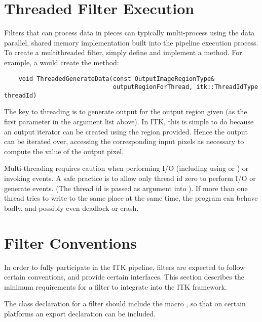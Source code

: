\section{Threaded Filter Execution}
\label{sec:ThreadedFilterExecution}

Filters that can process data in pieces can typically multi-process
using the data parallel, shared memory implementation built into the
pipeline execution process. To create a multithreaded filter, simply
define and implement a  method. For
example, a  would create the method:

\small
\begin{verbatim}
    void ThreadedGenerateData(const OutputImageRegionType& 
                              outputRegionForThread, itk::ThreadIdType threadId)
\end{verbatim}
\normalsize

The key to threading is to generate output for the output region given (as
the first parameter in the argument list above). In ITK, this is simple to do
because an output iterator can be created using the region provided. Hence
the output can be iterated over, accessing the corresponding input pixels as
necessary to compute the value of the output pixel.

Multi-threading requires caution when performing I/O (including using
 or ) or invoking events. A safe practice is to allow 
only thread id zero to perform I/O or generate events. (The thread id is
passed as argument into ).  If more than one
thread tries to write to the same place at the same time, the program can
behave badly, and possibly even deadlock or crash.


\section{Filter Conventions}
\label{sec:FilterConventions}

In order to fully participate in the ITK pipeline, filters are expected to
follow certain conventions, and provide certain interfaces.  This section
describes the minimum requirements for a filter to integrate into the ITK
framework.

The class declaration for a filter should include the macro
, so that on certain platforms an export declaration can be
included. 

